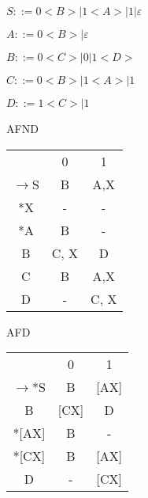 \documentclass[ ]{article}
\begin{document}
		$S::= 0<B> | 1<A> | 1 | \varepsilon$
		
		$A::= 0<B> | \varepsilon$
		
		$B::= 0<C> | 0 | 1<D>$
		
		$C::= 0<B> | 1<A> | 1$
		
		$D::= 1<C> | 1$
		
		\begin{center}
		AFND\\
		
		\begin{tabular}{ c c c }
  & 0 & 1 \\ 
 $\to$S & B & A,X \\  
 *X & - & - \\
 *A & B & - \\
 B & C, X & D\\
 C& B & A,X\\
 D & - & C, X
		\end{tabular}
		\end{center}
		
		\begin{center}
		AFD\\
		
		\begin{tabular}{ c c c }
   & 0 & 1 \\ 
 $\to$*S & B & [AX] \\  
 B & [CX] & D\\
 *[AX] & B & - \\
 *[CX] & B & [AX]\\
 D & - & [CX]
 		\end{tabular}
		\end{center}
\end{document}
